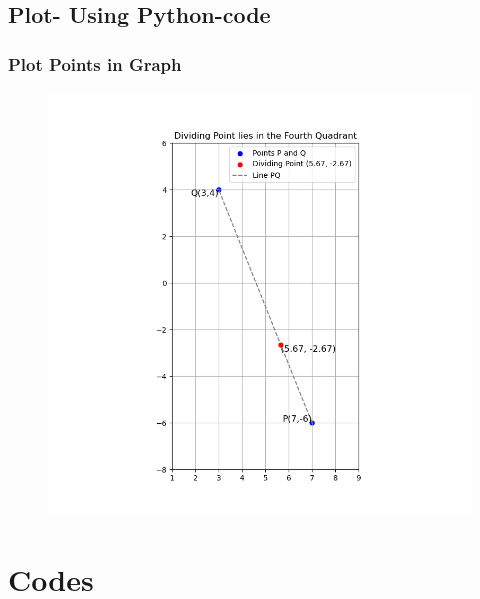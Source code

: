 \documentclass{beamer}
\theoremstyle{remark}
\numberwithin{equation}{section}
\begin{document}
\subsection{Plot- Using Python-code}
\begin{frame}
\frametitle{Plot Points in Graph}

		\begin{figure}[H]
	\centering
				\begin{minipage}{1\textwidth}
	\includegraphics[width=0.7\linewidth]{figs/Plot.png}
			\end{minipage}
			\end{figure}
			
\end{frame}
\section{Codes}
\end{document}
